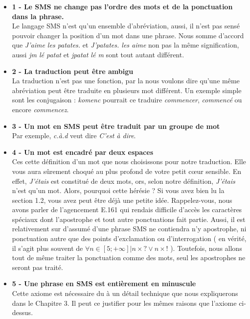 \documentclass[11pt]{book}
\begin{document}
	\begin{itemize}
		\item \textbf{1 - Le SMS ne change pas l'ordre des mots et de la ponctuation dans la phrase.}\\
		Le langage SMS n'est qu'un ensemble d'abréviation, aussi, il n'est pas sensé pouvoir changer la position d'un mot dans une phrase. Nous somme d'accord que {\em J'aime les patates.} et {\em J'patates. les aime} non pas la même signification, aussi {\em jm lé patat} et {\em jpatat lé m} sont tout autant différent.\\
		
		\item \textbf{2 - La traduction peut être ambigu}\\
		La traduction n'est pas une fonction, par la nous voulons dire qu'une même abréviation peut être traduite en plusieurs mot différent. Un exemple simple sont les conjugaison : {\em komenc} pourrait ce traduire {\em commencer}, {\em commencé} ou encore {\em commencez}.\\
		
		\item \textbf{3 - Un mot en SMS peut être traduit par un groupe de mot}\\
		Par exemple, {\em c.à.d} veut dire {\em C'est à dire}.\\
		
		\item \textbf{4 - Un mot est encadré par deux espaces}\\
		Ces cette définition d'un mot que nous choisissons pour notre traduction. Elle vous aura sûrement choqué au plus profond de votre petit cœur sensible. En effet, {\em J'étais} est constitué de deux mots, ors, selon notre définition, {\em J'étais} n'est qu'un mot. Alors, pourquoi cette hérésie ? Si vous avez bien lu la section 1.2, vous avez peut être déjà une petite idée. Rappelez-vous, nous avons parler de l'agencement E.161 qui rendais difficile d'accès les caractères spéciaux dont l'apostrophe et tout autre ponctuations fait partie. Aussi, il est relativement sur d'assumé d'une phrase SMS ne contiendra n'y apostrophe, ni ponctuation autre que des points d'exclamation ou d'interrogation ( en vérité, il s'agit plus souvent de $ \forall n \in [5;+\infty] | n \times ? \vee n \times ! $ ). Toutefois, nous allons tout de même traiter la ponctuation comme des mots, seul les apostrophes ne seront pas traité.\\
		\item \textbf{5 - Une phrase en SMS est entièrement en minuscule}\\
		Cette axiome est nécessaire du à un détail technique que nous expliquerons dans le Chapitre 3. Il peut ce justifier pour les mêmes raisons que l'axiome ci-dessus.\\
	\end{itemize}
	
\end{document}
